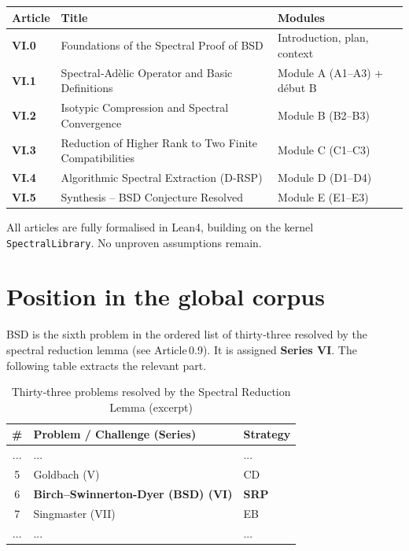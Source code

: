 \documentclass[11pt,a4paper]{article}
\begin{document}
\begin{center}
\small
\begin{tabular}{@{}>{\bfseries}l>{\raggedright\arraybackslash}p{4.5cm}>{\raggedright\arraybackslash}p{6cm}@{}}
\toprule
\textbf{Article} & \textbf{Title} & \textbf{Modules} \\
\midrule
VI.0 & Foundations of the Spectral Proof of BSD & Introduction, plan, context \\
VI.1 & Spectral‑Adèlic Operator and Basic Definitions & Module A (A1–A3) + début B \\
VI.2 & Isotypic Compression and Spectral Convergence & Module B (B2–B3) \\
VI.3 & Reduction of Higher Rank to Two Finite Compatibilities & Module C (C1–C3) \\
VI.4 & Algorithmic Spectral Extraction (D‑RSP) & Module D (D1–D4) \\
VI.5 & Synthesis – BSD Conjecture Resolved & Module E (E1–E3) \\
\bottomrule
\end{tabular}
\end{center}

All articles are fully formalised in Lean4, building on the kernel \texttt{SpectralLibrary}. No unproven assumptions remain.

\section{Position in the global corpus}

BSD is the sixth problem in the ordered list of thirty‑three resolved by the spectral reduction lemma (see Article 0.9). It is assigned \textbf{Series VI}. The following table extracts the relevant part.

\begin{center}
\begin{longtable}{@{}cll@{}}
\caption{Thirty‑three problems resolved by the Spectral Reduction Lemma (excerpt)}\\
\toprule
\# & Problem / Challenge (Series) & Strategy \\
\midrule
... & ... & ... \\
5 & Goldbach (V) & CD \\
6 & \textbf{Birch–Swinnerton-Dyer (BSD) (VI)} & \textbf{SRP} \\
7 & Singmaster (VII) & EB \\
... & ... & ... \\
\bottomrule
\end{longtable}
\end{center}
\end{document}
